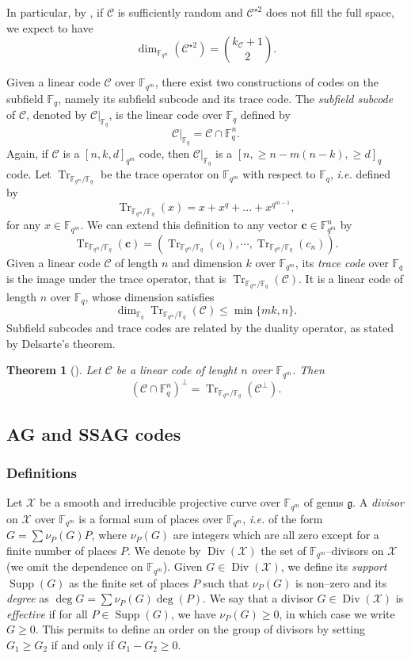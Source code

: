 \documentclass[a4paper]{amsart}
\newtheorem{thm}{Theorem}[section]
\theoremstyle{definition}
\theoremstyle{remark}
\newcommand{\calC}{\mathcal{C}}
\newcommand{\calX}{\mathcal{X}}
\newcommand{\fqm}{\mathbb{F}_{q^m}}
\newcommand{\fq}{\mathbb{F}_{q}}
\newcommand{\Tr}[1]{\operatorname{Tr}_{\mathbb{F}_{q^m}/\fq}\left(#1\right)}
\newcommand{\Supp}{\operatorname{Supp}}
\newcommand{\Div}{\operatorname{Div}}
\begin{document}
In particular, by \cite[Theorem~2.3]{CCMZ15}, if $\calC$ is sufficiently random and $\calC^{\star2}$ does not fill the full space, we expect to have 
\[ \dim_{\fqm}(\calC^{\star2}) = \binom{k_{\calC}+1}{2}.\]

Given a linear code $\calC$ over $\fqm$, there exist two constructions of codes on the subfield $\fq$, namely its subfield subcode and its trace code. The \emph{subfield subcode} of $\calC$, denoted by $\calC|_{\fq}$, is the linear code over $\fq$ defined by 
\[\calC|_{\fq}=\calC \cap \mathbb{F}_q^n.\]
Again, if $\calC$ is a $[n,k,d]_{q^m}$ code, then $\calC|_{\fq}$ is a $[n,\geq n-m(n-k),\geq d]_q$ code.
Let $\operatorname{Tr}_{\mathbb{F}_{q^m}/\fq}$ be the trace operator on $\mathbb{F}_{q^m}$ with respect to $\mathbb{F}_q$, \emph{i.e.} defined by
\[\Tr{x} = x + x^q + ... + x^{q^{m-1}},\]
for any $x \in \fqm$. We can extend this definition to any vector $\mathbf{c} \in \fqm^n$ by $$\Tr{\mathbf{c}}= (\Tr{c_1},\cdots,\Tr{c_n}).$$ 
Given a linear code $\calC$ of length $n$ and dimension $k$ over $\fqm$, its \emph{trace code} over $\fq$ is the image under the trace operator, that is $\Tr{\calC}$. It is a linear code of length $n$ over $\fq$, whose dimension satisfies
\begin{equation}\label{eq:dim_trace}
\dim_{\mathbb{F}_q} \Tr{\calC} \leq \min\{mk,n\}.
\end{equation}
Subfield subcodes and trace codes are related by the duality operator, as stated by Delsarte's theorem.

\begin{thm}[{\cite[Delsarte's theorem]{Del75}}] \label{th:delsarte}
Let $\calC$ be a linear code of lenght $n$ over $\fqm$. Then
\[\left(\calC \cap \fq^n\right)^{\perp} = \Tr{\calC^{\perp}}.\]
\end{thm}

\subsection{AG and SSAG codes} \label{section:AG_codes}

\subsubsection{Definitions}

Let $\calX$ be a smooth and irreducible projective curve over $\fqm$ of genus $\mathfrak{g}$. A \emph{divisor} on $\calX$ over $\fqm$ is a formal sum of places over $\fqm$, \emph{i.e.} of the form $G=\sum \nu_P(G) P$, where $\nu_P(G)$ are integers which are all zero except for a finite number of places $P$. We denote by $\Div(\calX)$ the set of $\fqm$--divisors on $\calX$ (we omit the dependence on $\fqm$).
Given $G \in \Div(\calX)$, we define its \emph{support} $\Supp(G)$ as the finite set of places $P$ such that $\nu_P(G)$ is non--zero and its \emph{degree} as $\deg G=\sum \nu_P(G) \deg(P)$. We say that a divisor $G \in \Div(\calX)$ is \emph{effective} if for all $P \in \Supp(G)$, we have $\nu_P(G) \geq 0$, in which case we write $G \geq 0$. This permits to define an order on the group of divisors by setting $G_1 \geq G_2$ if and only if $G_1-G_2 \geq 0$.
\end{document}
